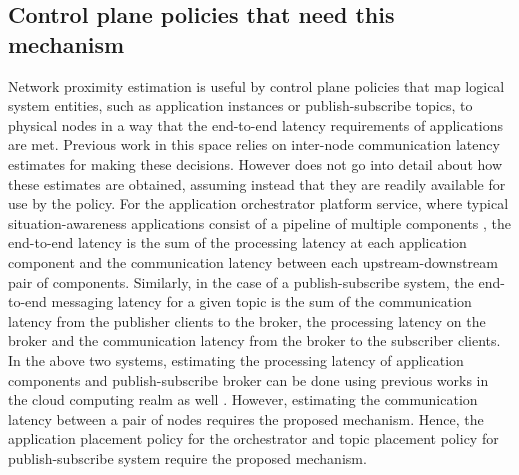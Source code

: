 \subsection{Control plane policies that need this mechanism}
Network proximity estimation is useful by control plane policies that map logical system entities, such as application instances or publish-subscribe topics, to physical nodes in a way that the end-to-end latency requirements of applications are met. Previous work in this space \cite{amarasinghe2018data,naas2017ifogstor,liu2019mobility} relies on inter-node communication latency estimates for making these decisions. However does not go into detail about how these estimates are obtained, assuming instead that they are readily available for use by the policy. For the application orchestrator platform service, where typical situation-awareness applications  consist of a pipeline of multiple components \cite{ananthanarayanan2017real,das2018edgebench}, the end-to-end latency is the sum of the processing latency at each application component and the communication latency between each upstream-downstream pair of components. Similarly, in the case of a publish-subscribe system, the end-to-end messaging latency for a given topic is the sum of the communication latency from the publisher clients to the broker, the processing latency on the broker and the communication latency from the broker to the subscriber clients. In the above two systems, estimating the processing latency of application components and publish-subscribe broker can be done using previous works in the cloud computing realm as well \cite{khare2018scalable}. However, estimating the communication latency between a pair of nodes requires the proposed mechanism. Hence, the application placement policy for the orchestrator and topic placement policy for publish-subscribe system require the proposed mechanism. 

